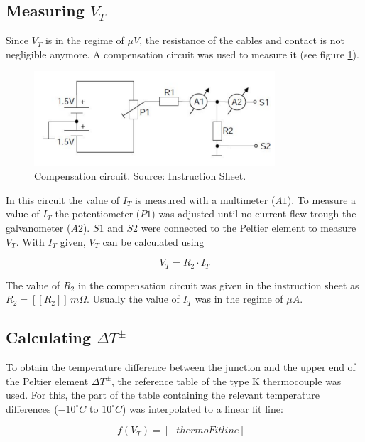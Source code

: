 \documentclass[a4paper]{article}
\begin{document}
\subsection{Measuring $V_T$}

Since $V_T$ is in the regime of $\mu V$, the resistance of the cables and contact is not negligible anymore. A compensation circuit was used to measure it (see figure \ref{fig:cc}).

\begin{figure}[H]
\captionsetup{singlelinecheck=off}
\centering
\includegraphics[width=0.8\textwidth]{img/compensation_circuit.png}
\caption[blubb]{Compensation circuit. Source: Instruction Sheet.}
\label{fig:cc}
\end{figure}

In this circuit the value of $I_T$ is measured with a multimeter ($A1$). To measure a value of $I_T$ the potentiometer ($P1$) was adjusted until no current flew trough the galvanometer ($A2$). $S1$ and $S2$ were connected to the Peltier element to measure $V_T$. With $I_T$ given, $V_T$ can be calculated using

\begin{equation}
V_T = R_2 \cdot I_T
\label{eq:V_T}
\end{equation}

The value of $R_2$ in the compensation circuit was given in the instruction sheet as $R_2 = [[R_2]]\, m\Omega$. Usually the value of $I_T$ was in the regime of $\mu A$.

\subsection{Calculating $\Delta T^{\pm}$}

To obtain the temperature difference between the junction and the upper end of the Peltier element $\Delta T^{\pm}$, the reference table of the type K thermocouple was used. For this, the part of the table containing the relevant temperature differences ($-10^{\circ}C$ to $10^{\circ}C$) was interpolated to a linear fit line:

\begin{equation}
f(V_T) = [[thermoFitline]]
\label{eq:thermoFitline}
\end{equation}
\end{document}
